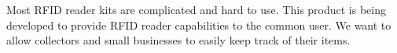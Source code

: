 Most RFID reader kits are complicated and hard to use. This product is being developed to provide RFID reader capabilities to the common user. We want to allow collectors and small businesses to easily keep track of their items.
